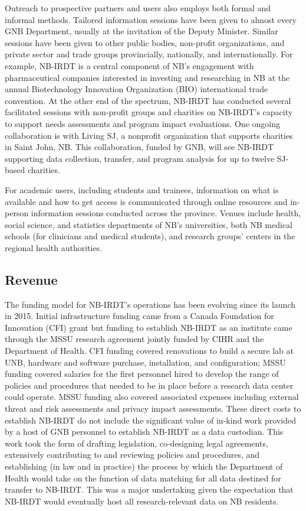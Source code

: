 Outreach to prospective partners and users also employs both formal and informal methods. Tailored information sessions have been given to almost every GNB Department, usually at the invitation of the Deputy Minister. Similar sessions have been given to other public bodies, non-profit organizations, and private sector and trade groups provincially, nationally, and internationally. For example, NB-IRDT is a central component of NB's engagement with pharmaceutical companies interested in investing and researching in NB at the annual Biotechnology Innovation Organization (BIO) international trade convention. At the other end of the spectrum, NB-IRDT has conducted several facilitated sessions with non-profit groups and charities on NB-IRDT's capacity to support needs assessments and program impact evaluations. One ongoing collaboration is with Living SJ, a nonprofit organization that supports charities in Saint John, NB. This collaboration, funded by GNB, will see NB-IRDT supporting data collection, transfer, and program analysis for up to twelve SJ-based charities.

For academic users, including students and trainees, information on what is available and how to get access is communicated through online resources and in-person information sessions conducted across the province. Venues include health, social science, and statistics departments of NB's universities, both NB medical schools (for clinicians and medical students), and research groups' centers in the regional health authorities.

\hypertarget{nbirdt-revenue}{%
\subsection{Revenue}\label{nbirdt-revenue}}

The funding model for NB-IRDT's operations has been evolving since its launch in 2015. Initial infrastructure funding came from a Canada Foundation for Innovation (CFI) grant but funding to establish NB-IRDT as an institute came through the MSSU research agreement jointly funded by CIHR and the Department of Health. CFI funding covered renovations to build a secure lab at UNB, hardware and software purchase, installation, and configuration; MSSU funding covered salaries for the first personnel hired to develop the range of policies and procedures that needed to be in place before a research data center could operate. MSSU funding also covered associated expenses including external threat and risk assessments and privacy impact assessments. These direct costs to establish NB-IRDT do not include the significant value of in-kind work provided by a host of GNB personnel to establish NB-IRDT as a data custodian. This work took the form of drafting legislation, co-designing legal agreements, extensively contributing to and reviewing policies and procedures, and establishing (in law and in practice) the process by which the Department of Health would take on the function of data matching for all data destined for transfer to NB-IRDT. This was a major undertaking given the expectation that NB-IRDT would eventually host all research-relevant data on NB residents.

